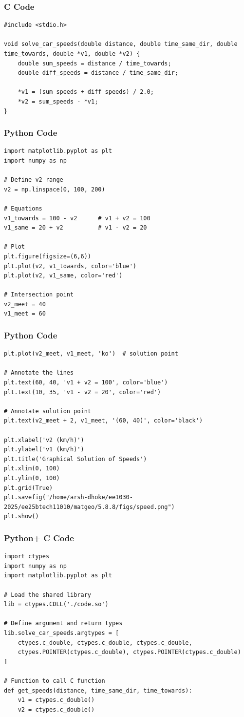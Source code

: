 \documentclass{beamer}
\begin{document}
\begin{frame}[fragile]
    \frametitle{C Code}
\begin{lstlisting}
#include <stdio.h>

void solve_car_speeds(double distance, double time_same_dir, double time_towards, double *v1, double *v2) {
    double sum_speeds = distance / time_towards;
    double diff_speeds = distance / time_same_dir;

    *v1 = (sum_speeds + diff_speeds) / 2.0;
    *v2 = sum_speeds - *v1;
}

\end{lstlisting}
\end{frame}

\begin{frame}[fragile]
    \frametitle{Python Code}
\begin{lstlisting}
import matplotlib.pyplot as plt
import numpy as np

# Define v2 range
v2 = np.linspace(0, 100, 200)

# Equations
v1_towards = 100 - v2      # v1 + v2 = 100
v1_same = 20 + v2          # v1 - v2 = 20

# Plot
plt.figure(figsize=(6,6))
plt.plot(v2, v1_towards, color='blue')
plt.plot(v2, v1_same, color='red')

# Intersection point
v2_meet = 40
v1_meet = 60
\end{lstlisting}
\end{frame}

\begin{frame}[fragile]
    \frametitle{Python Code}
\begin{lstlisting}
plt.plot(v2_meet, v1_meet, 'ko')  # solution point

# Annotate the lines
plt.text(60, 40, 'v1 + v2 = 100', color='blue')
plt.text(10, 35, 'v1 - v2 = 20', color='red')

# Annotate solution point
plt.text(v2_meet + 2, v1_meet, '(60, 40)', color='black')

plt.xlabel('v2 (km/h)')
plt.ylabel('v1 (km/h)')
plt.title('Graphical Solution of Speeds')
plt.xlim(0, 100)
plt.ylim(0, 100)
plt.grid(True)
plt.savefig("/home/arsh-dhoke/ee1030-2025/ee25btech11010/matgeo/5.8.8/figs/speed.png")
plt.show()

\end{lstlisting}
\end{frame}

\begin{frame}[fragile]
    \frametitle{Python+ C Code}
\begin{lstlisting}
import ctypes
import numpy as np
import matplotlib.pyplot as plt

# Load the shared library
lib = ctypes.CDLL('./code.so')

# Define argument and return types
lib.solve_car_speeds.argtypes = [
    ctypes.c_double, ctypes.c_double, ctypes.c_double,
    ctypes.POINTER(ctypes.c_double), ctypes.POINTER(ctypes.c_double)
]

# Function to call C function
def get_speeds(distance, time_same_dir, time_towards):
    v1 = ctypes.c_double()
    v2 = ctypes.c_double()
    \end{lstlisting}
\end{frame}
\end{document}

